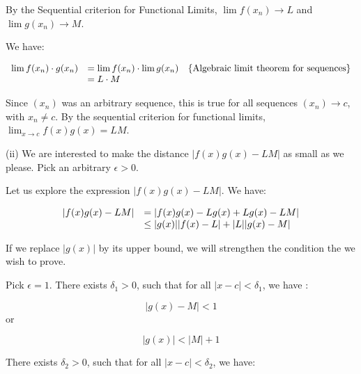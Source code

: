 \documentclass[10pt]{article}
\begin{document}
By the Sequential criterion for Functional Limits, $\displaystyle \lim f( x_{n})\rightarrow L$ and $\displaystyle \lim g( x_{n})\rightarrow M$.



We have:


\begin{equation*}
\begin{array}{ c l c }
\lim f( x_{n}) \cdot g( x_{n}) & =\lim f( x_{n}) \cdot \lim g( x_{n}) & \left\{\text{Algebraic limit theorem for sequences}\right\}\\
 & =L\cdot M & 
\end{array}
\end{equation*}


Since $\displaystyle ( x_{n})$ was an arbitrary sequence, this is true for all sequences $\displaystyle ( x_{n})\rightarrow c$, with $\displaystyle x_{n} \neq c$. By the sequential criterion for functional limits, $\displaystyle \lim _{x\rightarrow c} f( x) g( x) =LM$.



(ii) We are interested to make the distance $\displaystyle |f( x) g( x) -LM|$ as small as we please. Pick an arbitrary $\displaystyle \epsilon  >0$. 



Let us explore the expression $\displaystyle |f( x) g( x) -LM|$. We have:


\begin{equation*}
\begin{array}{ c l }
|f( x) g( x) -LM| & =|f( x) g( x) -Lg( x) +Lg( x) -LM|\\
 & \leq |g( x) ||f( x) -L|+|L||g( x) -M|
\end{array}
\end{equation*}


If we replace $\displaystyle |g( x) |$ by its upper bound, we will strengthen the condition the we wish to prove. 



Pick $\displaystyle \epsilon =1$. There exists $\displaystyle \delta _{1}  >0$, such that for all $\displaystyle |x-c|< \delta _{1}$, we have :


\begin{equation*}
|g( x) -M|< 1
\end{equation*}
or


\begin{equation*}
|g( x) |< | M|+1
\end{equation*}


There exists $\displaystyle \delta _{2}  >0$, such that for all $\displaystyle |x-c|< \delta _{2}$, we have:
\end{document}
